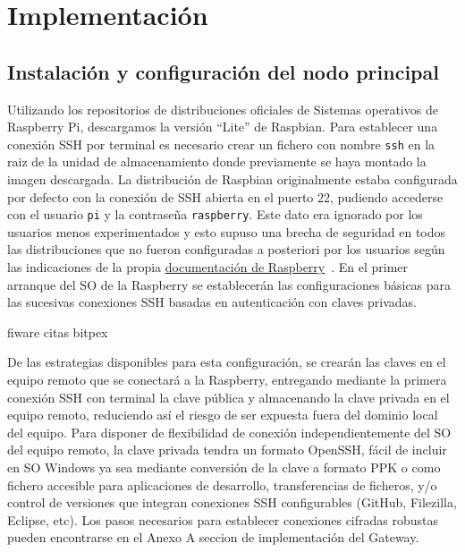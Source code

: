 \cleardoublepage

\chapter{Implementación}
\label{makereference5}



\section{Instalación y configuración del nodo principal}
\label{makereference5.1}
 Utilizando los repositorios de distribuciones oficiales de Sistemas operativos de Raspberry Pi, descargamos la versión ``Lite'' de Raspbian. Para establecer una conexión SSH por terminal es necesario crear un fichero con nombre \verb|ssh| en la raiz de la unidad de almacenamiento donde previamente se haya montado la imagen descargada. La distribución de Raspbian originalmente estaba configurada por defecto con la conexión de SSH abierta en el puerto 22, pudiendo accederse con el usuario \verb|pi| y la contraseña \verb|raspberry|. Este dato era ignorado por los usuarios menos experimentados y esto supuso una brecha de seguridad en todos las distribuciones que no fueron configuradas a posteriori por los usuarios según las indicaciones de la propia \href{https://www.raspberrypi.org/documentation/configuration/security.md}{documentación de Raspberry}~\cite{securingyourraspberrypi}. En el primer arranque del SO de la Raspberry se establecerán las configuraciones básicas para las sucesivas conexiones SSH basadas en autenticación con claves privadas.

 fiware citas bitpex

 De las estrategias disponibles para esta configuración, se crearán las claves en el equipo remoto que se conectará a la Raspberry, entregando mediante la primera conexión SSH con terminal la clave pública y almacenando la clave privada en el equipo remoto, reduciendo así el riesgo de ser expuesta fuera del dominio local del equipo. Para disponer de flexibilidad de conexión independientemente del SO del equipo remoto, la clave privada tendra un formato OpenSSH, fácil de incluir en SO Windows ya sea mediante conversión de la clave a formato PPK o como fichero accesible para aplicaciones de desarrollo, transferencias de ficheros, y/o control de versiones que integran conexiones SSH configurables (GitHub, Filezilla, Eclipse, etc). Los pasos necesarios para establecer conexiones cifradas robustas pueden encontrarse en el Anexo A seccion de implementación del Gateway.

